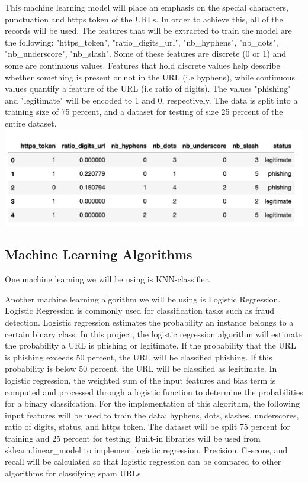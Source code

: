 \documentclass[conference]{IEEEtran}
\begin{document}
This machine learning model will place an emphasis on the special characters, punctuation and https token of the URLs. In order to achieve this, all of the records will be used. The features that will be extracted to train the model are the following: "https_token", "ratio_digits_url", "nb_hyphens", "nb_dots", "nb_underscore", "nb_slash". Some of these features are discrete (0 or 1) and some are continuous values. Features that hold discrete values help describe whether something is present or not in the URL (i.e hyphens), while continuous values quantify a feature of the URL (i.e ratio of digits). The values "phishing" and "legitimate" will be encoded to 1 and 0, respectively. The data is split into a training size of 75 percent, and a dataset for testing of size 25 percent of the entire dataset.  
\includegraphics{dataset.png}

\subsection{Machine Learning Algorithms}
One machine learning we will be using is KNN-classifier. 

Another machine learning algorithm we will be using is Logistic Regression. Logistic Regression is commonly used for classification tasks such as fraud detection. 
Logistic regression estimates the probability an instance belongs to a certain binary class.
 In this project, the logistic regression algorithm will estimate the probability a URL is phishing or legitimate.
  If the probability that the URL is phishing exceeds 50 percent, the URL will be classified phishing. 
  If this probability is below 50 percent, the URL will be classified as legitimate. 
  In logistic regression, the weighted sum of the input features and bias term is computed and processed through a logistic function to determine the probabilities for a binary classifcation. 
  For the implementation of this algorithm, the following input features will be used to train the data: hyphens, dots, slashes, underscores, ratio of digits, status, and https token. The dataset will be split 75 percent for training and 25 percent for testing. 
  Built-in libraries will be used from sklearn.linear_model to implement logistic regression. Precision, f1-score, and recall will be calculated so that logistic regression can be compared to other algorithms for classifying spam URLs. 
\end{document}
